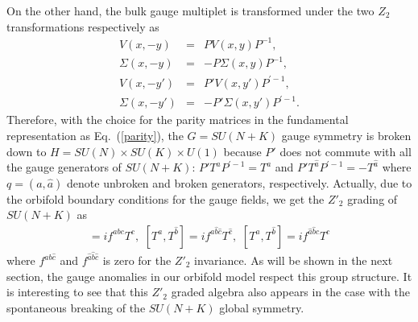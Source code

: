 \documentclass[a4paper,12pt]{article}
\begin{document}
On the other hand, the bulk gauge multiplet
is transformed under the two $Z_2$ transformations respectively as
\begin{eqnarray}
V(x,-y)&=&PV(x,y)P^{-1}, \\
\Sigma(x,-y)&=&-P\Sigma(x,y)P^{-1}, \\
V(x,-y')&=&P'V(x,y')P^{\prime -1}, \\
\Sigma(x,-y')&=&-P'\Sigma(x,y')P^{\prime -1}.
\end{eqnarray}
Therefore, with the choice for the parity matrices in the
fundamental representation as Eq.~(\ref{parity}), the $G=SU(N+K)$
gauge symmetry is broken down to $H=SU(N)\times SU(K)\times U(1)$
because $P'$ does not commute with all the gauge generators of
$SU(N+K)$: $P' T^a P^{\prime -1}=T^a$ and $P' T^{\hat a}P^{\prime
-1}=-T^{\hat a}$ where $q=(a,\hat a)$ denote unbroken and broken
generators, respectively. Actually, due to the orbifold boundary conditions
for the gauge fields, we get the $Z'_2$ grading of $SU(N+K)$ as
\begin{eqnarray}
[T^a,T^b]=if^{abc}T^c, \,\, [T^a,T^{\hat b}]=if^{a{\hat b}{\hat c}}T^{\hat c},
\,\, [T^{\hat a}, T^{\hat b}]=if^{{\hat a}{\hat b}c}T^c\label{z2grade}
\end{eqnarray}
where $f^{ab{\hat c}}$ and $f^{{\hat a}{\hat b}{\hat c}}$ is zero
for the $Z'_2$ invariance. As will be shown in the next section, 
the gauge anomalies in our orbifold model respect this group structure. 
It is interesting to see that this $Z'_2$ graded algebra also appears 
in the case with the spontaneous breaking of the $SU(N+K)$ global symmetry. 
\end{document}
